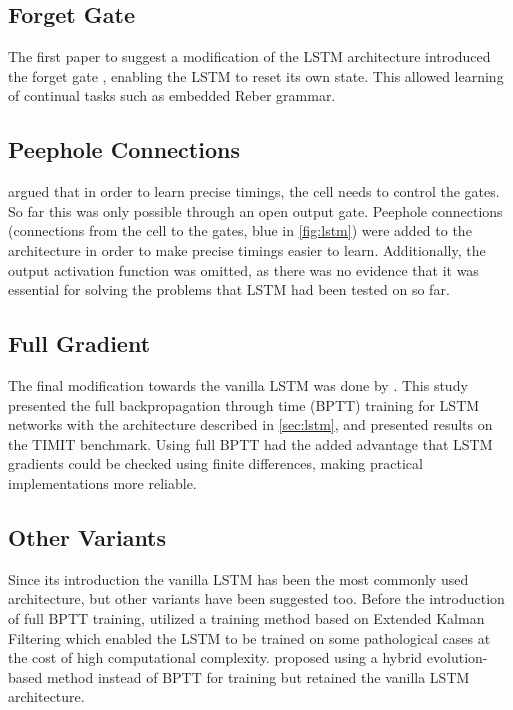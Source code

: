 \subsection{Forget Gate} The first paper to suggest a modification of the LSTM architecture introduced the forget gate \citep{Gers1999}, enabling the LSTM to reset its own state. This allowed learning of continual tasks such as embedded Reber grammar.

\subsection{Peephole Connections}\label{sec:peephole}
\citet{Gers2000} argued that in order to learn precise timings, the cell needs to control the gates. So far this was only possible through an open output gate. Peephole connections (connections from the cell to the gates, blue in \autoref{fig:lstm}) were added to the architecture in order to make precise timings easier to learn. Additionally, the output activation function was omitted, as there was no evidence that it was essential for solving the problems that LSTM had been tested on so far.

\subsection{Full Gradient} The final modification towards the vanilla LSTM was done by \citet{Graves2005}. 
This study presented the full backpropagation through time (BPTT) training for LSTM networks with the architecture described in \autoref{sec:lstm}, and presented results on the TIMIT \cite{Garofolo1993} benchmark. Using full BPTT had the added advantage that LSTM gradients could be checked using finite differences, making practical implementations more reliable.

\subsection{Other Variants} Since its introduction the vanilla LSTM has been the most commonly used architecture, but other variants have been suggested too. Before the introduction of full BPTT training, \citet{Gers2002} utilized a training method based on Extended Kalman Filtering which enabled the LSTM to be trained on some pathological cases at the cost of high computational complexity.
\citet{Schmidhuber2007} proposed using a hybrid evolution-based method instead of BPTT for training but retained the vanilla LSTM architecture. 

